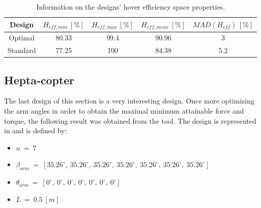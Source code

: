 \begin{table}[!ht]
\begin{center}
 \caption{Information on the designs’ hover efficiency space properties.}\vspace{1ex}
 \label{tab:tab_Penta_compare_hover}
  {\tiny\begin{tabular}{|c|cccc|}
 \hline
  Design & $H_{eff,min}\ [\%]$ & $H_{eff,max}\ [\%]$ & $H_{eff,mean}\ [\%]$
  & $MAD(H_{eff})\ [\%]$\\ \hline
  Optimal & 80.33 & 99.4 & 90.96 & 3\\
  Standard & 77.25 & 100 & 84.38 & 5.2\\
 \hline
\end{tabular}}
\end{center}
\end{table}

\subsection{Hepta-copter}
\label{sec:hepta_copter}

The last design of this section is a very interesting design. Once more optimizing
the arm angles in order to obtain the maximal minimum attainable force and torque,
the following result was obtained from the tool. The design is represented in
 and is defined by:

{\small\begin{itemize}
  \item $n\ =\ 7$
  \item $\beta_{arm}\ =\ [35.26^{\circ},\  35.26^{\circ},\  35.26^{\circ},\  35.26^{\circ},\
                          35.26^{\circ},\  35.26^{\circ},\  35.26^{\circ}]$
  \item $\theta_{arm}\ =\ [0^{\circ},\  0^{\circ},\  0^{\circ},\  0^{\circ},\  0^{\circ},\
                            0^{\circ},\  0^{\circ}]$
  \item $L\ =\ 0.5\ [m]$
\end{itemize}}

